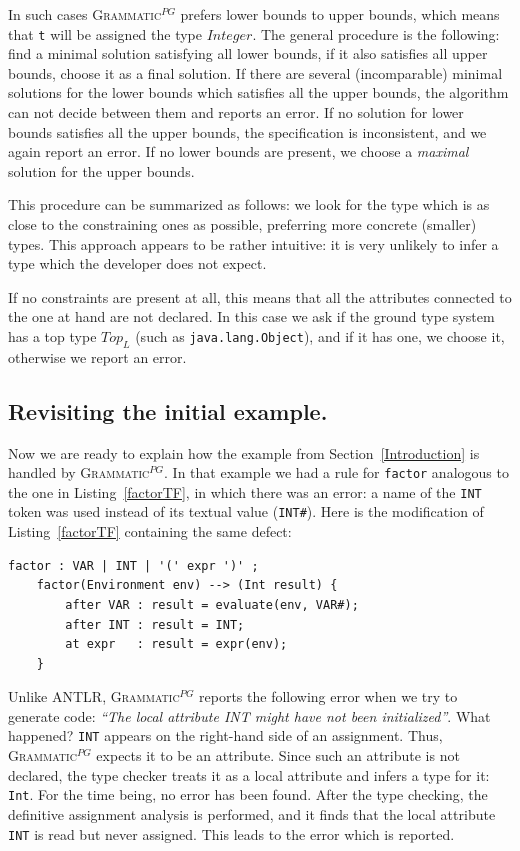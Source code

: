 \documentclass{informat} %
\newcommand{\lstref}[1]{Listing~\ref{#1}}
\newcommand{\secref}[1]{Section~\ref{#1}}
\newcommand{\tool}[1]{\textsc{#1}}
\newcommand{\ATF}{\textsc{Grammatic}$^{PG}$}
\begin{document}
In such cases \ATF{} prefers lower bounds to upper bounds, which means that \texttt{t} will be assigned the type $Integer$. The general procedure is the following: find a minimal solution satisfying all lower bounds, if it also satisfies all upper bounds, choose it as a final solution. If there are several (incomparable) minimal solutions for the lower bounds which satisfies all the upper bounds, the algorithm can not decide between them and reports an error. If no solution for lower bounds satisfies all the upper bounds, the specification is inconsistent, and we again report an error. If no lower bounds are present, we choose a \emph{maximal} solution for the upper bounds. 

This procedure can be summarized as follows: we look for the type which is as close to the constraining ones as possible, preferring more concrete (smaller) types. This approach appears to be rather intuitive: it is very unlikely to infer a type which the developer does not expect.

If no constraints are present at all, this means that all the attributes connected to the one at hand are not declared. In this case we ask if the ground type system has a top type $Top_L$ (such as \texttt{java.lang.Object}), and if it has one, we choose it, otherwise we report an error.

\subsection{Revisiting the initial example.}

Now we are ready to explain how the example from \secref{Introduction} is handled by \ATF{}. In that example we had a rule for \texttt{factor} analogous to the one in \lstref{factorTF}, in which there was an error: a name of the \texttt{INT} token was used instead of its textual value (\texttt{INT\#}). Here is the modification of \lstref{factorTF} containing the same defect:
\begin{lstlisting}
factor : VAR | INT | '(' expr ')' ;          
	factor(Environment env) --> (Int result) { 
		after VAR : result = evaluate(env, VAR#);  
		after INT : result = INT;
		at expr   : result = expr(env);           
	}
\end{lstlisting}
Unlike \tool{ANTLR}, \ATF{} reports the following error when we try to generate code: \emph{``The local attribute INT might have not been initialized''}. What happened? \texttt{INT} appears on the right-hand side of an assignment. Thus, \ATF{} expects it to be an attribute. Since such an attribute is not declared, the type checker treats it as a local attribute and infers a type for it: \texttt{Int}. For the time being, no error has been found. After the type checking, the definitive assignment analysis is performed, and it finds that the local attribute \texttt{INT} is read but never assigned. This leads to the error which is reported.
\end{document}
